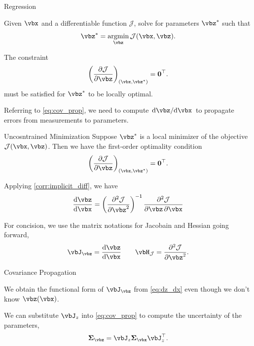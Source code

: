 \documentclass[8pt,aspectratio=169]{beamer}
\begin{document}
\begin{frame}{Regression}
  \begin{problem}[Optimization]
    Given $\vbx$ and a differentiable function $\mathcal{J}$, solve for
    parameters $\vbz^{*}$ such that
    \[
      \label{eq:minimization_problem}
      \vbz^{*} = \argmin_{\vbz} \mathcal{J}(\vbx,\vbz).
    \]
  \end{problem}

  \smallskip

  \begin{definition}
    The constraint
    \[
      \pdv{\mathcal{J}}{\vbz}_{(\vbx,\vbz^*)} = \vbzero^{\T}.
    \]
    must be satisfied for $\vbz^*$ to be locally optimal.
  \end{definition}

  \smallskip

  \begin{desiderata}
    Referring to \eqref{eq:cov_prop}, we need to compute
    $\odv{\vbz}/{\vbx}$ to propagate errors from measurements to
    parameters.
  \end{desiderata}
\end{frame}


\begin{frame}[fragile]{Uncosntrained Minimization}
  Suppose $\vbz^*$ is a local minimizer of the objective
  $\mathcal{J}(\vbx,\vbz)$. Then we have the first-order optimality
  condition
  \[
    \pdv{\mathcal{J}}{\vbz}_{(\vbx,\vbz^*)}=\vbzero^{\T}.
  \]

  \smallskip
  
  Applying \eqref{corr:implicit_diff}, we have
  \begin{equation}
    \odv{\vbz}{\vbx} = \left(\pdv[order=2]{\mathcal{J}}{\vbz}\right)^\inv\pdv{\mathcal{J}}{\vbz,\vbx}
  \end{equation}

  \smallskip
  
  For concision, we use the matrix notations for Jacobain and Hessian going forward,
  \begin{equation}
    \label{eq:dz_dx}
    \vbJ_{\vbz} = \odv{\vbz}{\vbx} \qquad \vbH_{\mathcal{J}} =\pdv[order=2]{\mathcal{J}}{\vbz}.
  \end{equation}
\end{frame}

\begin{frame}{Covariance Propagation}
  \begin{remark}
    We obtain the functional form of $\vbJ_{\vbz}$ from
    \eqref{eq:dz_dx} even though we don't know $\vbz(\vbx)$.
  \end{remark}
  
  We can substitute $\vbJ_z$ into \eqref{eq:cov_prop} to compute the
  uncertainty of the parameters,
  \[
    \vbSigma_{\vbz} = \vbJ_z \vbSigma_{\vbx}\vbJ^{\T}_z.
  \]
\end{frame}
\end{document}
